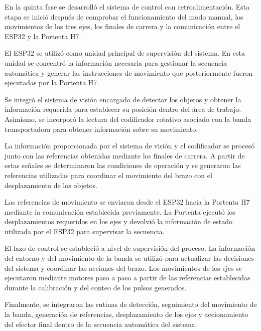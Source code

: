 
En la quinta fase se desarrolló el sistema de control con retroalimentación. Esta etapa se inició después de comprobar el funcionamiento del modo manual, los movimientos de los tres ejes, los finales de carrera y la comunicación entre el ESP32 y la Portenta H7.

El ESP32 se utilizó como unidad principal de supervisión del sistema. En esta unidad se concentró la información necesaria para gestionar la secuencia automática y generar las instrucciones de movimiento que posteriormente fueron ejecutadas por la Portenta H7.

Se integró el sistema de visión encargado de detectar los objetos y obtener la información requerida para establecer su posición dentro del área de trabajo. Asimismo, se incorporó la lectura del codificador rotativo asociado con la banda transportadora para obtener información sobre su movimiento.

La información proporcionada por el sistema de visión y el codificador se procesó junto con las referencias obtenidas mediante los finales de carrera. A partir de estas señales se determinaron las condiciones de operación y se generaron las referencias utilizadas para coordinar el movimiento del brazo con el desplazamiento de los objetos.

Las referencias de movimiento se enviaron desde el ESP32 hacia la Portenta H7 mediante la comunicación establecida previamente. La Portenta ejecutó los desplazamientos requeridos en los ejes y devolvió la información de estado utilizada por el ESP32 para supervisar la secuencia.

El lazo de control se estableció a nivel de supervisión del proceso. La información del entorno y del movimiento de la banda se utilizó para actualizar las decisiones del sistema y coordinar las acciones del brazo. Los movimientos de los ejes se ejecutaron mediante motores paso a paso a partir de las referencias establecidas durante la calibración y del conteo de los pulsos generados.

Finalmente, se integraron las rutinas de detección, seguimiento del movimiento de la banda, generación de referencias, desplazamiento de los ejes y accionamiento del efector final dentro de la secuencia automática del sistema.



